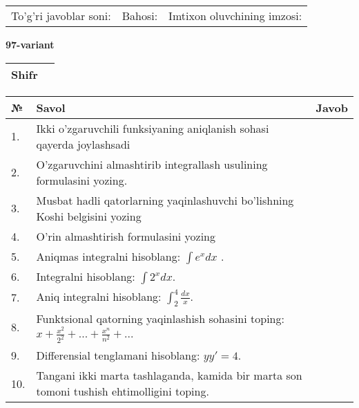 \documentclass{article}
\begin{document}
  \vspace{1cm}
  
  \begin{tabular}{lll}
  To'g'ri javoblar soni: \underline{\hspace{1.5cm}} & 
  Bahosi: \underline{\hspace{1.5cm}} & 
  Imtixon oluvchining imzosi: \underline{\hspace{2cm}} \\
  \end{tabular}
  
  \egroup
  
  \newpage
  
  
  \textbf{97-variant}\\
  
  \bgroup
  \def\arraystretch{1.6} %
  
  \begin{tabular}{|m{5.7cm}|m{9.5cm}|}
  \hline
  Shifr & \\
  \hline
  \end{tabular}
  
  \vspace{1cm}
  
  \begin{tabular}{|m{0.7cm}|m{10cm}|m{4cm}|}
  \hline
  № & Savol & Javob \\
  \hline
  1. & Ikki o'zgaruvchili funksiyaning aniqlanish sohasi qayerda joylashsadi &  \\
  \hline
  2. & O'zgaruvchini almashtirib integrallash usulining formulasini yozing. &  \\
  \hline
  3. & Musbat hadli qatorlarning yaqinlashuvchi bo'lishning Koshi belgisini yozing &  \\
  \hline
  4. & O'rin almashtirish formulasini yozing &  \\
  \hline
  5. & Aniqmas integralni hisoblang: \(\int {e^{x}dx}\) . &  \\
  \hline
  6. & Integralni hisoblang: \(\int {2^{x}dx}\). &  \\
  \hline
  7. & Aniq integralni hisoblang: \(\int_{2}^{4}\frac{dx}{x}\). &  \\
  \hline
  8. & Funktsional qatorning yaqinlashish sohasini toping: \(x + \frac{x^{2}}{2^{2}} + ... + \frac{x^{n}}{n^{2}} + ...\) &  \\
  \hline
  9. & Differensial tenglamani hisoblang: \(yy' = 4\). &  \\
  \hline
  10. & Tangani ikki marta tashlaganda, kamida bir marta son tomoni tushish ehtimolligini toping. &  \\
  \hline
  \end{tabular}
  
\end{document}
